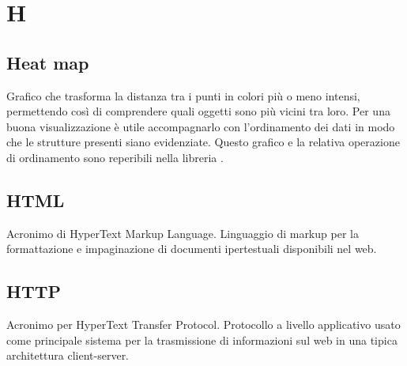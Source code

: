 \section*{H}
\markright{}
\subsection*{Heat map}
Grafico che trasforma la distanza tra i punti in colori più o meno intensi, permettendo così di comprendere quali oggetti sono più vicini tra loro. Per una buona visualizzazione è utile accompagnarlo con l'ordinamento dei dati in modo che le strutture presenti siano evidenziate. Questo grafico e la relativa operazione di ordinamento sono reperibili nella libreria .

\subsection*{HTML}
Acronimo di HyperText Markup Language. Linguaggio di markup per la formattazione e impaginazione di documenti ipertestuali disponibili nel web.

\subsection*{HTTP}
Acronimo per HyperText Transfer Protocol. Protocollo a livello applicativo usato come principale sistema per la trasmissione di informazioni sul web in una tipica architettura client-server.